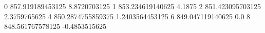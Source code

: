 0 857.919189453125 8.8720703125
1 853.234619140625 4.1875
2 851.423095703125 2.3759765625
4 850.2874755859375 1.2403564453125
6 849.047119140625 0.0
8 848.561767578125 -0.4853515625
